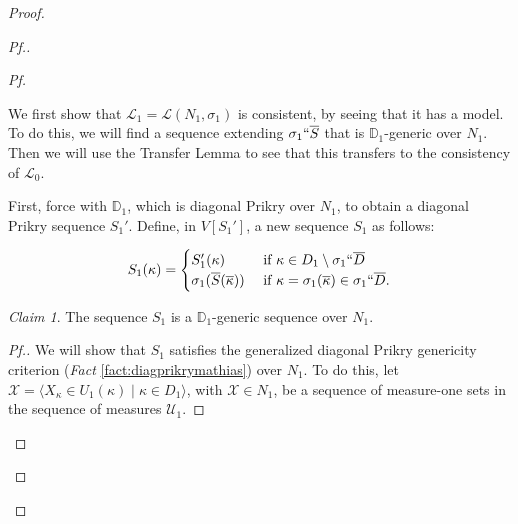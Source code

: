 \documentclass{amsart}
\theoremstyle{definition}
\theoremstyle{remark}
\newtheorem*{claim}{Claim}
\newcommand{\D}{\mathbb{D}}
\renewcommand{\S}{{\overline{S}}}
\newcommand{\U}{\mathcal{U}}
\newcommand{\st}{\; | \;}
\newcommand{\seq}[2]{\langle #1 \st #2 \rangle}
\begin{document}
\begin{proof}
\begin{proof}[Pf.]
\begin{proof}[Pf]
\begin{center}
\end{center} 
We first show that $\mathcal L_1=\mathcal L(N_1, \sigma_1)$ is consistent, by seeing that it has a model. To do this, we will find a sequence extending $\sigma_1``\S$ that is $\D_1$-generic over $N_1$. Then we will use the Transfer Lemma to see that this transfers to the consistency of $\mathcal L_0$. %

First, force with $\D_1$, which is diagonal Prikry over $N_1$, to obtain a diagonal Prikry sequence $S_1'$. Define, in $V[S_1']$, a new sequence $S_1$ as follows:

$$S_1(\kappa) = \begin{cases} S_1'(\kappa) &\text{ if } \kappa \in D_1 \setminus \sigma_1``\overline D \\
					\sigma_1(\overline S(\overline \kappa)) &\text{ if } \kappa = \sigma_1(\overline \kappa) \in \sigma_1``\overline D. \end{cases}$$

\begin{claim} The sequence $S_1$ is a $\D_1$-generic sequence over $N_1$. \end{claim}
\begin{proof}[Pf.]
We will show that $S_1$ satisfies the generalized diagonal Prikry genericity criterion (\textit{Fact} \ref{fact:diagprikrymathias}) over $N_1$. To do this, let $\mathcal X = \seq{ X_\kappa \in U_1(\kappa) }{ \kappa \in D_1 }$, with $\mathcal X \in N_1$, be a sequence of measure-one sets in the sequence of measures $\U_1$.


\end{proof}
\end{proof}
\end{proof}
\end{proof}
\end{document}
